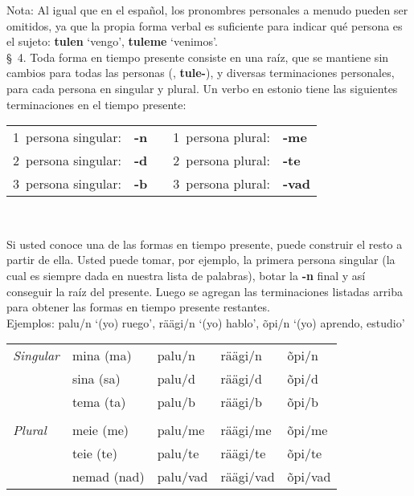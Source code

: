 Nota: Al igual que en el español, los pronombres personales a menudo pueden ser omitidos, ya que la propia forma verbal es suficiente para indicar qué persona es el sujeto: \textbf{tulen} `vengo', \textbf{tuleme} `venimos'.\\

\S\ 4. Toda forma en tiempo presente consiste en una raíz, que se mantiene sin cambios para todas las personas (\eg, \textbf{tule-}), y diversas terminaciones personales, para cada persona en singular y plural. Un verbo en estonio tiene las siguientes terminaciones en el tiempo presente:\\

\begin{tabular}{ l l c l l }
	1\textordmasculine\ persona singular: & \textbf{-n}	& & 1\textordmasculine\ persona plural: & \textbf{-me} \\
	2\textordmasculine\ persona singular: & \textbf{-d}	& & 2\textordmasculine\ persona plural: & \textbf{-te} \\
	3\textordmasculine\ persona singular: & \textbf{-b}	& & 3\textordmasculine\ persona plural: & \textbf{-vad}
\end{tabular}\\ \bigskip

Si usted conoce una de las formas en tiempo presente, puede construir el resto a partir de ella. Usted puede tomar, por ejemplo, la primera persona singular (la cual es siempre dada en nuestra lista de palabras), botar la \textbf{-n} final y así conseguir la raíz del presente. Luego se agregan las terminaciones listadas arriba para obtener las formas en tiempo presente restantes.\\

Ejemplos: palu/n `(yo) ruego', räägi/n `(yo) hablo', õpi/n `(yo) aprendo, estudio'\\

\begin{tabular}{ l l l l l }
	\emph{Singular}	& mina (ma)		& palu/n	& räägi/n	& õpi/n \\
					& sina (sa)		& palu/d	& räägi/d	& õpi/d \\
					& tema (ta)		& palu/b	& räägi/b	& õpi/b \\
					& & & & \\
	\emph{Plural}	& meie (me)		& palu/me	& räägi/me	& õpi/me \\
					& teie (te)		& palu/te	& räägi/te	& õpi/te \\
					& nemad (nad)	& palu/vad	& räägi/vad	& õpi/vad 
\end{tabular}\\ \bigskip

